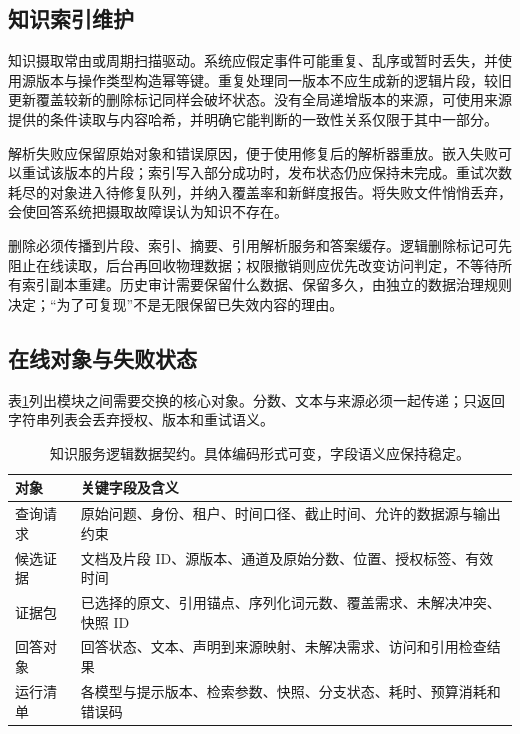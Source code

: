 \documentclass[../textbook.tex]{subfiles}
\begin{document}
\subsection{知识索引维护}
知识摄取常由或周期扫描驱动。系统应假定事件可能重复、乱序或暂时丢失，并使用源版本与操作类型构造幂等键。重复处理同一版本不应生成新的逻辑片段，较旧更新覆盖较新的删除标记同样会破坏状态。没有全局递增版本的来源，可使用来源提供的条件读取与内容哈希，并明确它能判断的一致性关系仅限于其中一部分。

解析失败应保留原始对象和错误原因，便于使用修复后的解析器重放。嵌入失败可以重试该版本的片段；索引写入部分成功时，发布状态仍应保持未完成。重试次数耗尽的对象进入待修复队列，并纳入覆盖率和新鲜度报告。将失败文件悄悄丢弃，会使回答系统把摄取故障误认为知识不存在。

删除必须传播到片段、索引、摘要、引用解析服务和答案缓存。逻辑删除标记可先阻止在线读取，后台再回收物理数据；权限撤销则应优先改变访问判定，不等待所有索引副本重建。历史审计需要保留什么数据、保留多久，由独立的数据治理规则决定；“为了可复现”不是无限保留已失效内容的理由。

\subsection{在线对象与失败状态}
表\ref{tab:rag-contract}列出模块之间需要交换的核心对象。分数、文本与来源必须一起传递；只返回字符串列表会丢弃授权、版本和重试语义。

\begin{table}[htbp]
\centering
\caption[知识服务逻辑数据契约]{知识服务逻辑数据契约。具体编码形式可变，字段语义应保持稳定。}\label{tab:rag-contract}
\begin{tabularx}{\linewidth}{@{}lX@{}}
\toprule
对象 & 关键字段及含义 \\
\midrule
查询请求 & 原始问题、身份、租户、时间口径、截止时间、允许的数据源与输出约束 \\
候选证据 & 文档及片段 ID、源版本、通道及原始分数、位置、授权标签、有效时间 \\
证据包 & 已选择的原文、引用锚点、序列化词元数、覆盖需求、未解决冲突、快照 ID \\
回答对象 & 回答状态、文本、声明到来源映射、未解决需求、访问和引用检查结果 \\
运行清单 & 各模型与提示版本、检索参数、快照、分支状态、耗时、预算消耗和错误码 \\
\bottomrule
\end{tabularx}
\end{table}
\end{document}
